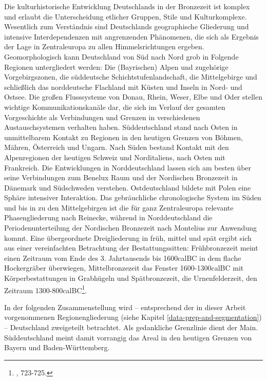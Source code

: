 \documentclass[openany,twoside,twocolumn]{book}
\let\rmarkdownfootnote\footnote%
\def\footnote{\protect\rmarkdownfootnote}
\begin{document}
Die kulturhistorische Entwicklung Deutschlands in der Bronzezeit ist
komplex und erlaubt die Unterscheidung etlicher Gruppen, Stile und
Kulturkomplexe. Wesentlich zum Verständnis sind Deutschlands
geographische Gliederung und intensive Interdependenzen mit angrenzenden
Phänomenen, die sich als Ergebnis der Lage in Zentraleuropa zu allen
Himmelsrichtungen ergeben. Geomorphologisch kann Deutschland von Süd
nach Nord grob in Folgende Regionen untergliedert werden: Die
(Bayrischen) Alpen und zugehörige Vorgebirgszonen, die süddeutsche
Schichtstufenlandschaft, die Mittelgebirge und schließlich das
norddeutsche Flachland mit Küsten und Inseln in Nord- und Ostsee. Die
großen Flusssysteme von Donau, Rhein, Weser, Elbe und Oder stellen
wichtige Kommunikationskanäle dar, die sich im Verlauf der gesamten
Vorgeschichte als Verbindungen und Grenzen in verschiedenen
Austauschsystemen verhalten haben. Süddeutschland stand nach Osten in
unmittelbarem Kontakt zu Regionen in den heutigen Grenzen von Böhmen,
Mähren, Österreich und Ungarn. Nach Süden bestand Kontakt mit den
Alpenregionen der heutigen Schweiz und Norditaliens, nach Osten mit
Frankreich. Die Entwicklungen in Norddeutschland lassen sich am besten
über seine Verbindungen zum Benelux Raum und der Nordischen Bronzezeit
in Dänemark und Südschweden verstehen. Ostdeutschland bildete mit Polen
eine Sphäre intensiver Interaktion. Das gebräuchliche chronologische
System im Süden und bis in zu den Mittelgebirgen ist die für ganz
Zentraleuropa relevante Phasengliederung nach Reinecke, während in
Norddeutschland die Periodenunterteilung der Nordischen Bronzezeit nach
Montelius zur Anwendung kommt. Eine übergeordnete Dreigliederung in
früh, mittel und spät ergibt sich aus einer vereinfachten Betrachtung
der Bestattungssitten: Frühbronzezeit meint einen Zeitraum vom Ende des
3. Jahrtausends bis 1600calBC in dem flache Hockergräber überwiegen,
Mittelbronzezeit das Fenster 1600-1300calBC mit Körperbestattungen in
Grabhügeln und Spätbronzezeit, die Urnenfelderzeit, den Zeitraum
1300-800calBC\footnote{\textcite{jockenhovel_germany_2013}, 723-725.}.

In der folgenden Zusammenstellung wird -- entsprechend der in dieser
Arbeit vorgenommenen Regionengliederung (siehe Kapitel
\ref{data-prep-and-segmentation}) -- Deutschland zweigeteilt betrachtet.
Als gedankliche Grenzlinie dient der Main. Süddeutschland meint damit
vorrangig das Areal in den heutigen Grenzen von Bayern und
Baden-Württemberg.
\end{document}

